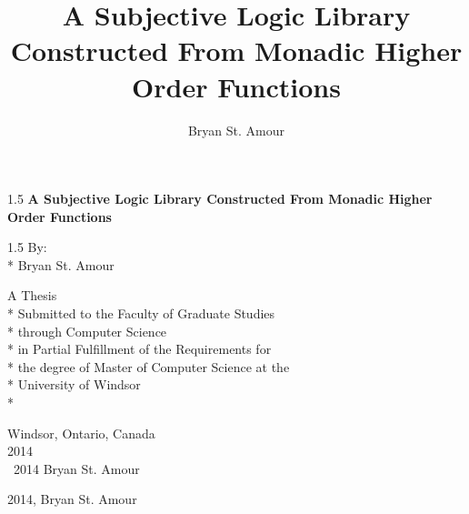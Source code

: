 \documentclass[oneside]{book}
\title{A Subjective Logic Library Constructed From Monadic Higher Order Functions}
\author{Bryan St. Amour}
\newcommand{\uwinonehalfspacelen}{1.5}
\newenvironment{uwinonehalfspaceenv}%
{\begin{spacing}{\uwinonehalfspacelen}}%
  {\end{spacing}}
\begin{document}



\clearpage


\thispagestyle{empty}
\begin{center}
  \vspace*{1in}

  \begin{uwinonehalfspaceenv}
    \Large\textbf{A Subjective Logic Library Constructed From Monadic Higher Order Functions}
  \end{uwinonehalfspaceenv}

  \vspace{\fill} %
  \begin{uwinonehalfspaceenv}
    By:\\*
    Bryan St. Amour
  \end{uwinonehalfspaceenv}
  \vspace{\fill}

  \normalsize
  A Thesis \\*
  Submitted to the Faculty of Graduate Studies \\*
  through Computer Science \\*
  in Partial Fulfillment of the Requirements for \\*
  the degree of Master of Computer Science at the \\*
  University of Windsor \\*

  \vspace{1in}
  Windsor, Ontario, Canada \\
  \vspace{0.5cm}
  2014 \\
  \vspace{0.5cm}
  \textcopyright \  2014 Bryan St. Amour
\end{center}


\clearpage
\thispagestyle{empty}

\vspace*{\fill}

\noindent \textcopyright{} 2014, Bryan St. Amour

\vspace{2ex}
\end{document}
